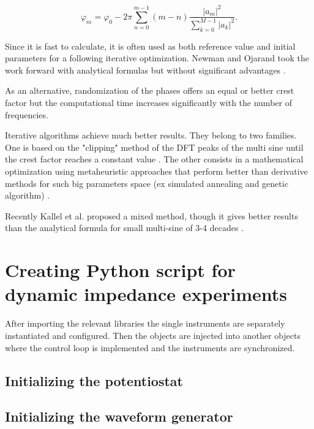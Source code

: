 $$
\varphi_m = \varphi _0 - 2 \pi \sum _{n=0} ^{m-1} (m-n) \frac{|a_m|^2}{\sum_{k=0}^{M-1}|a_k|^2}. 
$$

Since it is fast to calculate, it is often used as both  reference value and initial parameters for a following iterative optimization. Newman and Ojarand took the work forward with analytical formulas but without significant advantages \cite{ojarandRecentAdvancesCrest2017}.

As an alternative, randomization of the phases offers an equal or better crest factor but the computational time increases significantly with the number of frequencies.

Iterative algorithms achieve much better results. They belong to two families. One is based on the "clipping" method of the DFT peaks of the multi sine until the crest factor reaches a constant value \cite{yangImprovedCrestFactor2015}. 
The other consists in a mathematical optimization using metaheuristic approaches that perform better than derivative methods for such big parameters space (ex simulated annealing and genetic algorithm) \cite{janeiroPeakFactorOptimization2020}.

Recently Kallel et al. proposed a mixed method, though it gives better results than the analytical formula for small multi-sine of 3-4 decades \cite{batteries8100176}.

\chapter{Creating Python script for dynamic impedance experiments}
\label{app:deis meas script}

After importing the relevant libraries the single instruments are separately instantiated and configured.
Then the objects are injected into another objects where the control loop is implemented and the instruments are synchronized.

\section{Initializing the potentiostat}


\section{Initializing the waveform generator}


